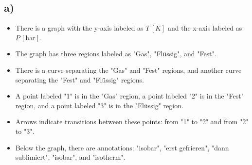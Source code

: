 

\subsection*{a)}

\begin{itemize}
    \item There is a graph with the y-axis labeled as \( T \, [K] \) and the x-axis labeled as \( P \, [\text{bar}] \).
    \item The graph has three regions labeled as "Gas", "Flüssig", and "Fest".
    \item There is a curve separating the "Gas" and "Fest" regions, and another curve separating the "Fest" and "Flüssig" regions.
    \item A point labeled "1" is in the "Gas" region, a point labeled "2" is in the "Fest" region, and a point labeled "3" is in the "Flüssig" region.
    \item Arrows indicate transitions between these points: from "1" to "2" and from "2" to "3".
    \item Below the graph, there are annotations: "isobar", "erst gefrieren", "dann sublimiert", "isobar", and "isotherm".
\end{itemize}